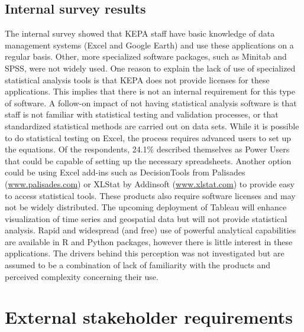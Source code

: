 \subsection{Internal survey results}
The internal survey showed that KEPA staff have basic knowledge of data management systems (Excel and Google Earth) and use these applications on a regular basis. Other, more specialized software packages, such as Minitab and SPSS, were not widely used. One reason to explain the lack of use of specialized statistical analysis tools is that KEPA does not provide licenses for these applications. This implies that there is not an internal requirement for this type of software. A follow-on impact of not having statistical analysis software is that staff is not familiar with statistical testing and validation processes, or that standardized statistical methods are carried out on data sets. While it is possible to do statistical testing on Excel, the process requires advanced users to set up the equations. Of the respondents, 24.1\% described themselves as Power Users that could be capable of setting up the necessary spreadsheets. Another option could be using Excel add-ins such as DecisionTools from Palisades (\url{www.palisades.com}) or XLStat by Addinsoft (\url{www.xlstat.com}) to provide easy to access statistical tools.  These products also require software licenses and may not be widely distributed. The upcoming deployment of Tableau will enhance visualization of time series and geospatial data but will not provide statistical analysis. Rapid and widespread (and free) use of powerful analytical capabilities are available in R and Python packages, however there is little interest in these applications. The drivers behind this perception was not investigated but are assumed to be a combination of lack of familiarity with the products and perceived complexity concerning their use. 

\section{External stakeholder requirements}


